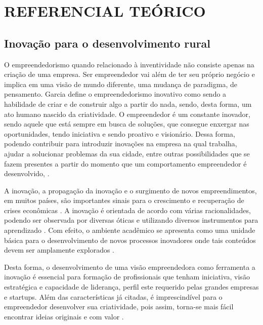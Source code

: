 \chapter{REFERENCIAL TEÓRICO}


\section{Inovação para o desenvolvimento rural}

O empreendedorismo quando relacionado à inventividade não consiste apenas na criação de uma empresa. Ser empreendedor vai além de ter seu próprio negócio e implica em uma visão de mundo diferente, uma mudança de paradigma, de pensamento. Garcia \cite{garcia_formacao_2000} define o empreendedorismo inovativo como sendo a habilidade de criar e de construir algo a partir do nada, sendo, desta forma, um ato humano nascido da criatividade. O empreendedor é um constante inovador, sendo aquele que está sempre em busca de soluções, que consegue enxergar nas oportunidades, tendo iniciativa e sendo proativo e visionário. Dessa forma, podendo contribuir para introduzir inovações na empresa na qual trabalha, ajudar a solucionar problemas da sua cidade, entre outras possibilidades que se fazem presentes a partir do momento que um comportamento empreendedor é desenvolvido, \cite{alencar_intencao_2019, loiola_cao_2016}.

A inovação, a propagação da inovação e o surgimento de novos empreendimentos, em muitos países, são importantes sinais para o crescimento e recuperação de crises econômicas \cite{silva_educacao_2017}. A inovação é orientada de acordo com várias racionalidades, podendo ser observada por diversas óticas e utilizando diversos instrumentos para aprendizado \cite{munoz_innovacion_2016}. Com efeito, o ambiente acadêmico se apresenta como uma unidade básica para o desenvolvimento de novos processos inovadores onde tais conteúdos devem ser amplamente explorados \cite{costa_inovacao_2017}. 

Desta forma, o desenvolvimento de uma visão empreendedora como ferramenta a inovação é essencial para formação de profissionais que tenham iniciativa, visão estratégica e capacidade de liderança, perfil este requerido pelas grandes empresas e startups. Além das características já citadas, é imprescindível para o empreendedor desenvolver sua criatividade, pois assim, torna-se mais fácil encontrar ideias originais e com valor \cite{macedo_capital_2019}. 

